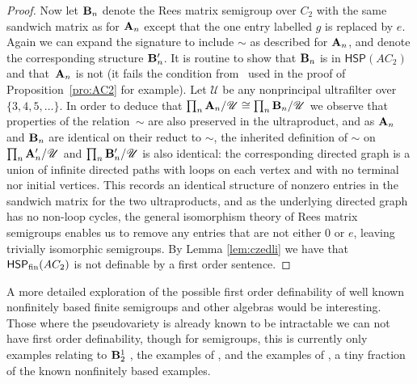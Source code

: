 \documentclass[reqno]{amsart}
\theoremstyle{plain}
\theoremstyle{definition}
\begin{document}
\begin{proof}
Now let ${\bf B}_n$ denote the Rees matrix semigroup over $C_2$ with the same sandwich matrix as for ${\bf A}_n$ except that the one entry labelled $g$ is replaced by $e$.  Again we can expand the signature to include $\sim$ as described for ${\bf A}_n$, and denote the corresponding structure ${\bf B}_n'$.  It is routine to show that ${\bf B}_n$ is in $\mathsf{HSP}(AC_2)$ and that~${\bf A}_n$ is not (it fails the condition from~\cite{VGK} used in the proof of Proposition~\ref{pro:AC2} for example).  Let $\mathscr{U}$ be any nonprincipal ultrafilter over $\{3,4,5,\dots\}$.  In order to deduce that $\prod_{n}{\bf A}_n/\mathscr{U}\cong \prod_{n}{\bf B}_n/\mathscr{U}$ we observe that properties of the relation~$\sim$ are also preserved in the ultraproduct, and as ${\bf A}_n$ and ${\bf B}_n$ are identical on their reduct to $\sim$, the inherited definition of $\sim$ on $\prod_{n}{\bf A}_n'/\mathscr{U}$ and $\prod_{n}{\bf B}_n'/\mathscr{U}$ is also identical: the corresponding directed graph is a union of infinite directed paths with loops on each vertex and with no terminal nor initial vertices.  This records an identical structure of nonzero entries in the sandwich matrix for the two ultraproducts, and as the underlying directed graph has no non-loop cycles,  the general isomorphism theory of Rees matrix semigroups enables us to remove any entries that are not either $0$ or $e$, leaving trivially isomorphic semigroups.  By Lemma \ref{lem:czedli} we have that $\mathsf{HSP}_{\rm fin}(AC_2)$ is not definable by a first order sentence.
\end{proof}
A more detailed exploration of the possible first order definability of well known nonfinitely based finite semigroups and other algebras would be interesting.  Those where the pseudovariety is already known to be intractable we can not have first order definability, though for semigroups, this is currently only examples relating to ${\bf B}_2^1$  \cite{jac:SAT}, the examples of \cite{jacmck}, and the examples of \cite{KKP}, a tiny fraction of the known nonfinitely based examples.
\end{document}
